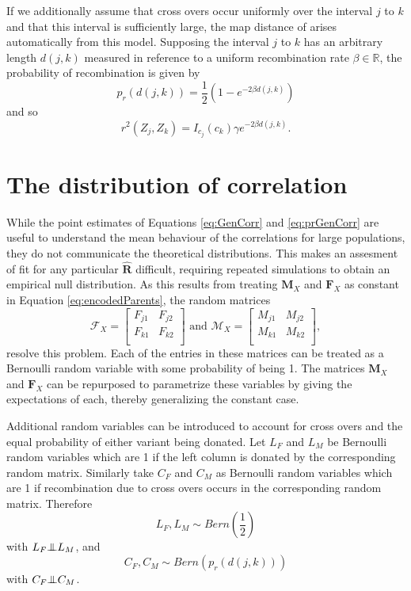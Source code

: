 \documentclass{article}
\newcommand{\m}[1]{\mathbf{#1}}               %
\newcommand{\indep}{\bot\hspace{-.6em}\bot}
\newcommand{\ind}[2]{I_{#2} \left( #1 \right)}
\newcommand{\corr}{r^2}
\newcommand{\field}[1]{\mathbb{#1}}
\newcommand{\Reals}{\field{R}}
\begin{document}
If we additionally assume that cross overs occur uniformly over the interval $j$ to $k$ and that this interval is sufficiently large, the map distance of \cite{haldane1919} arises automatically from this model. Supposing the interval $j$ to $k$ has an arbitrary length $d(j,k)$ measured in reference to a uniform recombination rate $\beta \in \Reals$, the probability of recombination is given by
$$p_r(d(j,k)) = \frac{1}{2} \left ( 1 - e^{-2\beta d(j,k)} \right )$$
and so
\begin{equation} \label{eq:GenCorr}
  \corr(Z_j, Z_k) = \ind{c_k}{c_j} \gamma e^{-2 \beta d(j,k)}.
\end{equation}

\section{The distribution of correlation} \label{sec:distribution}

While the point estimates of Equations \ref{eq:GenCorr} and \ref{eq:prGenCorr} are useful to understand the mean behaviour of the correlations for large populations, they do not communicate the theoretical distributions. This makes an assesment of fit for any particular $\widehat{\m{R}}$ difficult, requiring repeated simulations to obtain an empirical null distribution. As this results from treating $\m{M}_X$ and $\m{F}_X$ as constant in Equation \ref{eq:encodedParents}, the random matrices
\begin{equation} \label{eq:encodedParents}
  \mathcal{F}_X = \begin{bmatrix}
  F_{j1} & F_{j2} \\
  F_{k1} & F_{k2} \\
\end{bmatrix} \text{ and }
\mathcal{M}_X = \begin{bmatrix}
  M_{j1} & M_{j2} \\
  M_{k1} & M_{k2} \\
\end{bmatrix},
\end{equation}
resolve this problem. Each of the entries in these matrices can be treated as a Bernoulli random variable with some probability of being 1. The matrices $\m{M}_X$ and $\m{F}_X$ can be repurposed to parametrize these variables by giving the expectations of each, thereby generalizing the constant case.

Additional random variables can be introduced to account for cross overs and the equal probability of either variant being donated. Let $L_F$ and $L_M$ be Bernoulli random variables which are 1 if the left column is donated by the corresponding random matrix. Similarly take $C_F$ and $C_M$ as Bernoulli random variables which are 1 if recombination due to cross overs occurs in the corresponding random matrix. Therefore
\begin{equation} \label{eq:LFLM}
  L_F, L_M \sim Bern \left ( \frac{1}{2} \right )
\end{equation}
with $L_F \indep L_M$, and
\begin{equation} \label{eq:CFCM}
  C_F, C_M \sim Bern \left ( p_r(d(j,k)) \right )
\end{equation}
with $C_F \indep C_M$.
\end{document}
